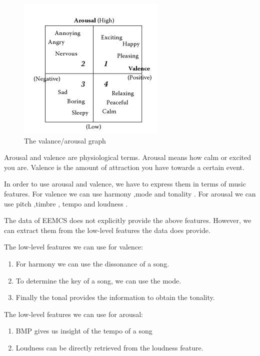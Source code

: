 \documentclass[10pt,a4paper]{article}
\begin{document}
\begin{figure}[h]
\includegraphics[scale=0.75]{avgraph.jpg}
\caption{The valance/arousal graph \cite{Book}}
\label{fig:avgraph}

\end{figure}

Arousal and valence are physiological terms.
Arousal means how calm or excited you are.
Valence is the amount of attraction you have towards a certain event.

In order to use arousal and valence, we have to express them in terms of music features.
For valence we can use harmony \cite{PresentationMER},mode  \cite{PresentationMER} and tonality  \cite{PresentationMER}.
For arousal we can use pitch \cite{PresentationMER} ,timbre \cite{PresentationMER}, tempo \cite{PresentationMER} and loudness \cite{PaperME}.

\newpage

The data of EEMCS does not explicitly provide the above features. However, we can extract them from the low-level features the data does provide.

The low-level features we can use for valence:
\begin{enumerate}
\item For harmony we can use the dissonance of a song.
\item To determine the key of a song, we can use the mode.
\item Finally the tonal provides the information to obtain the tonality.
\end{enumerate}
The low-level features we can use for arousal:
\begin{enumerate}
\item BMP gives us insight of the tempo of a song
\item Loudness can be directly retrieved from the loudness feature.
\end{enumerate}
\end{document}
